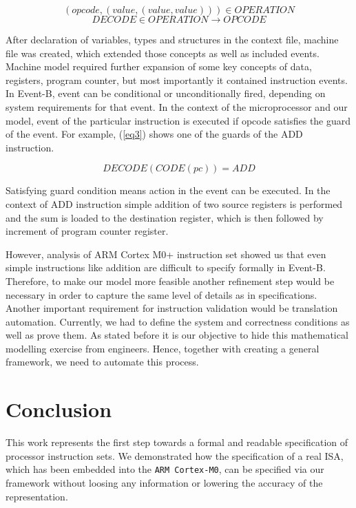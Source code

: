 \documentclass[conference]{IEEEtran}
\begin{document}
\begin{equation}
(opcode,(value, (value, value))) \in OPERATION
\label{eq1}
\end{equation}
\begin{equation}
DECODE \in OPERATION \rightarrow OPCODE
\label{eq2}
\end{equation}

After declaration of variables, types and structures in the context file, machine file was created, which
extended those concepts as well as included events. Machine model required further expansion of some key
concepts of data, registers, program counter, but most importantly it contained instruction events. In
Event-B, event can be conditional or unconditionally fired, depending on system requirements for that event.
In the context of the microprocessor and our model, event of the particular instruction is executed if
opcode satisfies the guard of the event. For example, (\ref{eq3}) shows one of the guards of the ADD
instruction.

\begin{equation}
DECODE(CODE(pc)) = ADD
\label{eq3}
\end{equation}

Satisfying guard condition means action in the event can be executed. In the context of ADD instruction
simple addition of two source registers is performed and the sum is loaded to the destination register,
which is then followed by increment of program counter register. 

However, analysis of ARM Cortex M0+ instruction set showed us that even simple instructions like addition
are difficult to specify formally in Event-B. Therefore, to make our model more feasible another refinement step would be
necessary in order to capture the same level of details as in specifications. Another important requirement
for instruction validation would be translation automation. Currently, we had to define the system and
correctness conditions as well as prove them. As stated before it is our objective to hide this mathematical
modelling exercise from engineers. Hence, together with creating a general framework, we need to automate
this process.


\section{Conclusion}
\label{sec:conclusion}
This work represents the first step towards a formal and readable specification of
processor instruction sets. We demonstrated how the specification of a real ISA, which has
been embedded into the \verb|ARM Cortex-M0|, can be specified via our framework without
loosing any information or lowering the accuracy of the representation.
\end{document}
